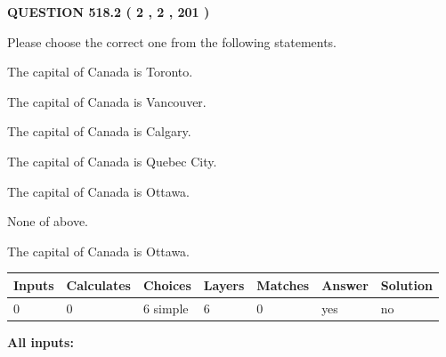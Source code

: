 \documentclass[12pt]{article}
\begin{document}
   
  
\vspace{0.2in}
  
{\textbf{\Large{QUESTION
518.2 
 ( 2 , 2 , 201 )
}}}
  
  
Please choose the correct one from the following statements.
 
 
The capital of Canada is Toronto.
 
 
The capital of Canada is Vancouver.
 
 
The capital of Canada is Calgary.
 
 
The capital of Canada is Quebec City.
 
 
The capital of Canada is Ottawa.
 
 
 None of above.
 
 
\noindent{}
 
 
The capital of Canada is Ottawa.
 
 
\noindent{}
 
 
   
   
   
   
\noindent\begin{tabular}{|l|l|l|l|l|l|l|}
 \hline
Inputs & Calculates & Choices & Layers & Matches & Answer & Solution \\ \hline
 0  & 
 0  & 
 6
  simple  
  & 
 6  & 
 0  & 
  yes & 
  no 
  \\ \hline
 \end{tabular}
   
   
   
   
\noindent{}
   
   
   
   
\noindent\vspace{0.1in}\hspace{-0.08in} {\textbf{\Large{All inputs: }}}
   
   
   
   
   
   
 \vspace{0.2in}
 
   
   
\end{document}

